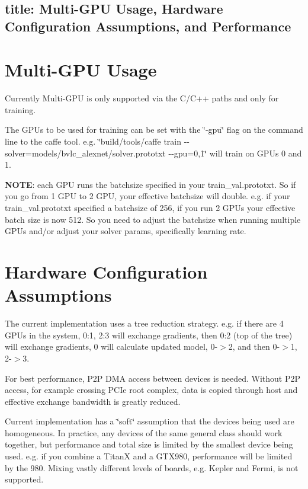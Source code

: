 

 \subsection*{title\+: Multi-\/\+G\+PU Usage, Hardware Configuration Assumptions, and Performance }

\section*{Multi-\/\+G\+PU Usage}

Currently Multi-\/\+G\+PU is only supported via the C/\+C++ paths and only for training.

The G\+P\+Us to be used for training can be set with the \char`\"{}-\/gpu\char`\"{} flag on the command line to the \textquotesingle{}caffe\textquotesingle{} tool. e.\+g. \char`\"{}build/tools/caffe train -\/-\/solver=models/bvlc\+\_\+alexnet/solver.\+prototxt -\/-\/gpu=0,1\char`\"{} will train on G\+P\+Us 0 and 1.

{\bfseries N\+O\+TE}\+: each G\+PU runs the batchsize specified in your train\+\_\+val.\+prototxt. So if you go from 1 G\+PU to 2 G\+PU, your effective batchsize will double. e.\+g. if your train\+\_\+val.\+prototxt specified a batchsize of 256, if you run 2 G\+P\+Us your effective batch size is now 512. So you need to adjust the batchsize when running multiple G\+P\+Us and/or adjust your solver params, specifically learning rate.

\section*{Hardware Configuration Assumptions}

The current implementation uses a tree reduction strategy. e.\+g. if there are 4 G\+P\+Us in the system, 0\+:1, 2\+:3 will exchange gradients, then 0\+:2 (top of the tree) will exchange gradients, 0 will calculate updated model, 0-\/$>$2, and then 0-\/$>$1, 2-\/$>$3.

For best performance, P2P D\+MA access between devices is needed. Without P2P access, for example crossing P\+C\+Ie root complex, data is copied through host and effective exchange bandwidth is greatly reduced.

Current implementation has a \char`\"{}soft\char`\"{} assumption that the devices being used are homogeneous. In practice, any devices of the same general class should work together, but performance and total size is limited by the smallest device being used. e.\+g. if you combine a TitanX and a G\+T\+X980, performance will be limited by the 980. Mixing vastly different levels of boards, e.\+g. Kepler and Fermi, is not supported.

